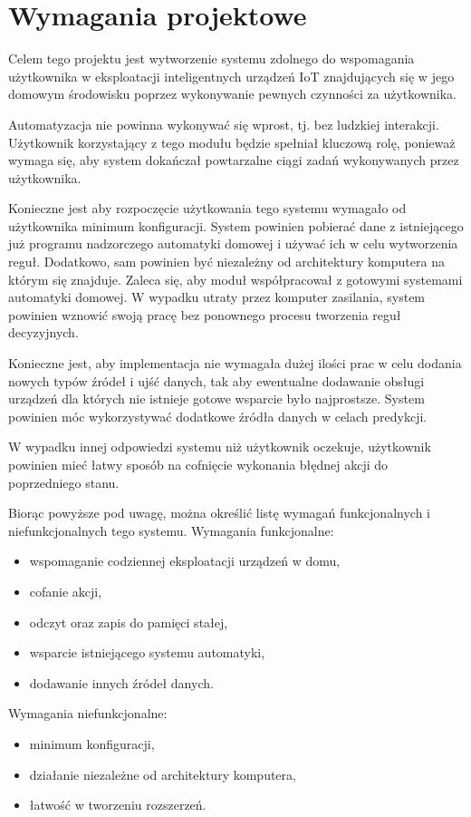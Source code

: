 \chapter{Wymagania projektowe}
\label{chapter:wymagania}
Celem tego projektu jest wytworzenie systemu zdolnego do wspomagania użytkownika w eksploatacji inteligentnych urządzeń IoT znajdujących się w jego domowym środowisku poprzez wykonywanie pewnych czynności za użytkownika. 

Automatyzacja nie powinna wykonywać się wprost, tj. bez ludzkiej interakcji. Użytkownik korzystający z tego modułu będzie spełniał kluczową rolę, ponieważ wymaga się, aby system dokańczał powtarzalne ciągi zadań wykonywanych przez użytkownika.

Konieczne jest aby rozpoczęcie użytkowania tego systemu wymagało od użytkownika minimum konfiguracji. System powinien pobierać dane z istniejącego już programu nadzorczego automatyki domowej i używać ich w celu wytworzenia reguł. Dodatkowo, sam powinien być niezależny od architektury komputera na którym się znajduje. Zaleca się, aby moduł współpracował z gotowymi systemami automatyki domowej. W wypadku utraty przez komputer zasilania, system powinien wznowić swoją pracę bez ponownego procesu tworzenia reguł decyzyjnych.

Konieczne jest, aby implementacja nie wymagała dużej ilości prac w celu dodania nowych typów źródeł i ujść danych, tak aby ewentualne dodawanie obsługi urządzeń dla których nie istnieje gotowe wsparcie było najprostsze. System powinien móc wykorzystywać dodatkowe źródła danych w celach predykcji.

W wypadku innej odpowiedzi systemu niż użytkownik oczekuje, użytkownik powinien mieć łatwy sposób na cofnięcie wykonania błędnej akcji do poprzedniego stanu.

Biorąc powyższe pod uwagę, można określić listę wymagań funkcjonalnych i niefunkcjonalnych tego systemu.
Wymagania funkcjonalne:
\begin{itemize}
    \item wspomaganie codziennej eksploatacji urządzeń w domu,
    \item cofanie akcji,
    \item odczyt oraz zapis do pamięci stałej,
    \item wsparcie istniejącego systemu automatyki,
    \item dodawanie innych źródeł danych.
\end{itemize}
Wymagania niefunkcjonalne:
\begin{itemize}
    \item minimum konfiguracji,
    \item działanie niezależne od architektury komputera,
    \item łatwość w tworzeniu rozszerzeń.
\end{itemize}

